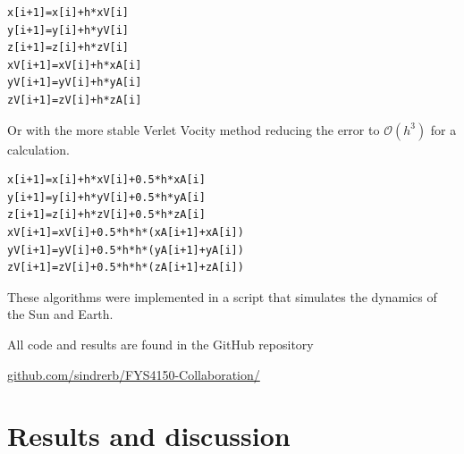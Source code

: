 \documentclass[twoside,twocolumn]{article}
\newcommand{\nl}{
	
	\medskip
	\noindent
}
\newcommand{\err}[1]{\mathcal{O}(#1)}
\begin{document}
\begin{lstlisting}[style=customc]
x[i+1]=x[i]+h*xV[i]
y[i+1]=y[i]+h*yV[i]
z[i+1]=z[i]+h*zV[i]
xV[i+1]=xV[i]+h*xA[i]
yV[i+1]=yV[i]+h*yA[i]
zV[i+1]=zV[i]+h*zA[i]
\end{lstlisting}

Or with the more stable Verlet Vocity method reducing the error to $\err{h^3}$ for a calculation. 
\begin{lstlisting}[style=customc]
x[i+1]=x[i]+h*xV[i]+0.5*h*xA[i]
y[i+1]=y[i]+h*yV[i]+0.5*h*yA[i]
z[i+1]=z[i]+h*zV[i]+0.5*h*zA[i]
xV[i+1]=xV[i]+0.5*h*h*(xA[i+1]+xA[i])
yV[i+1]=yV[i]+0.5*h*h*(yA[i+1]+yA[i])
zV[i+1]=zV[i]+0.5*h*h*(zA[i+1]+zA[i])
\end{lstlisting}
These algorithms were implemented in a script that simulates the dynamics of the Sun and Earth. 

All code and results are found in the GitHub repository\nl
{\small \href{https://github.com/sindrerb/FYS4150-Collaboration/tree/master/Doc/Project3}{github.com/sindrerb/FYS4150-Collaboration/}}
\section{Results and discussion}
\label{sec:results}
\end{document}
